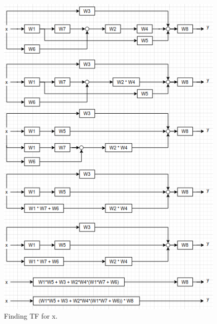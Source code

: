 \documentclass{article}
\begin{document}
         \begin{figure}[hbt!]
            \centering
            \includegraphics[scale=0.7]{hm_6x3.png}
            \caption{Finding TF for x.}
        \end{figure}
        
        
\end{document}
